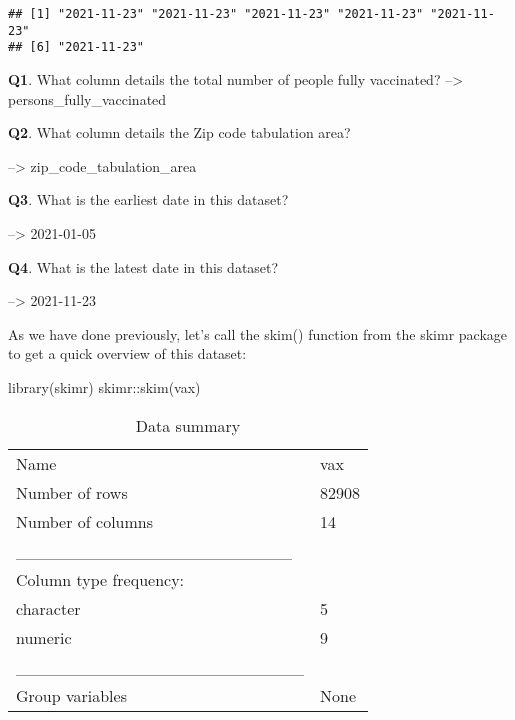\documentclass[
]{article}
\newenvironment{Shaded}{\begin{snugshade}}{\end{snugshade}}
\newcommand{\AttributeTok}[1]{\textcolor[rgb]{0.77,0.63,0.00}{#1}}
\newcommand{\ConstantTok}[1]{\textcolor[rgb]{0.00,0.00,0.00}{#1}}
\newcommand{\FunctionTok}[1]{\textcolor[rgb]{0.00,0.00,0.00}{#1}}
\newcommand{\NormalTok}[1]{#1}
\newcommand{\OtherTok}[1]{\textcolor[rgb]{0.56,0.35,0.01}{#1}}
\newcommand{\SpecialCharTok}[1]{\textcolor[rgb]{0.00,0.00,0.00}{#1}}
\begin{document}
\begin{Shaded}
\end{Shaded}

\begin{verbatim}
## [1] "2021-11-23" "2021-11-23" "2021-11-23" "2021-11-23" "2021-11-23"
## [6] "2021-11-23"
\end{verbatim}

\textbf{Q1}. What column details the total number of people fully
vaccinated? --\textgreater{} persons\_fully\_vaccinated

\textbf{Q2}. What column details the Zip code tabulation area?

--\textgreater{} zip\_code\_tabulation\_area

\textbf{Q3}. What is the earliest date in this dataset?

--\textgreater{} 2021-01-05

\textbf{Q4}. What is the latest date in this dataset?

--\textgreater{} 2021-11-23

As we have done previously, let's call the skim() function from the
skimr package to get a quick overview of this dataset:

\begin{Shaded}
\begin{Highlighting}[]
\FunctionTok{library}\NormalTok{(skimr)}
\NormalTok{skimr}\SpecialCharTok{::}\FunctionTok{skim}\NormalTok{(vax)}
\end{Highlighting}
\end{Shaded}

\begin{longtable}[]{@{}ll@{}}
\caption{Data summary}\tabularnewline
\toprule
\endhead
Name & vax \\
Number of rows & 82908 \\
Number of columns & 14 \\
\_\_\_\_\_\_\_\_\_\_\_\_\_\_\_\_\_\_\_\_\_\_\_ & \\
Column type frequency: & \\
character & 5 \\
numeric & 9 \\
\_\_\_\_\_\_\_\_\_\_\_\_\_\_\_\_\_\_\_\_\_\_\_\_ & \\
Group variables & None \\
\bottomrule
\end{longtable}
\end{document}
